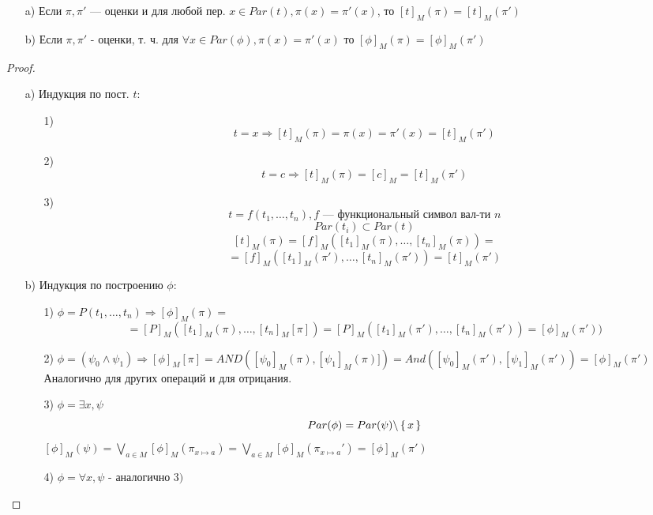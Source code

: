 \begin{theorem}
\begin{itemize}
  \item [a) ] Если $\pi, \pi'$ --- оценки и для любой пер. $x \in Par(t), \pi(x) = \pi'(x)$, то $[t]_M(\pi) = [t]_M(\pi')$
  \item [b) ] Если $\pi, \pi'$ - оценки, т. ч. для $\forall x \in Par(\phi), \pi(x) = \pi'(x)$ то $[\phi]_M(\pi) = [\phi]_M(\pi')$
\end{itemize}
\end{theorem}
\begin{proof}
\begin{itemize}
  \item [a) ] Индукция по пост. $t$:
    \begin{itemize}
      \item [1) ] \[
      t = x \Rightarrow [t]_M(\pi) = \pi(x) = \pi'(x) = [t]_M(\pi')
      \]
    \item [2) ] \[
        t = c \Rightarrow [t]_M(\pi) = [c]_M = [t]_M(\pi')
    \]
  \item [3) ] \[
    t = f(t_1, \ldots, t_n), f \text{ --- функциональный символ вал-ти $n$}
  \]
  \[
  Par(t_i) \subset Par(t)
  \]
  \[
  [t]_M(\pi) = [f]_M([t_1]_M(\pi), \ldots, [t_n]_M(\pi)) = 
  \]
  \[
  = [f]_M([t_1]_M(\pi'), \ldots, [t_n]_M(\pi')) = [t]_M(\pi')
  \]
    \end{itemize}
  \item [b) ] Индукция по построению $\phi$:
    \begin{itemize}
      \item [1) ] $\phi = P(t_1, \ldots, t_n) \Rightarrow [\phi]_M(\pi) =$ \[
      =[P]_M([t_1]_M(\pi), \ldots, [t_n]_M[\pi]) = [P]_M([t_1]_M(\pi'), \ldots, [t_n]_M(\pi')) = [\phi]_M(\pi'))
      \]
    \item [2) ] $\phi = (\psi_0 \land \psi_1) \Rightarrow [\phi]_M[\pi] = AND([\psi_0]_M(\pi), [\psi_1]_M(\pi)]) = And([\psi_0]_M(\pi'), [\psi_1]_M(\pi')) = [\phi]_M(\pi')$ Аналогично для других операций и для отрицания.
  \item [3) ] $\phi = \exists x, \psi$ \[
  Par(\phi) = Par(\psi) \backslash \set{x}
  \] $[\phi]_M(\psi) = \bigvee_{a \in M} [\phi]_M(\pi_{x\mapsto a}) = \bigvee_{a \in M} [\phi]_M(\pi_{x \mapsto a}') = [\phi]_M(\pi')$ \item [4) ] $\phi = \forall x, \psi \text{ -  аналогично $3)$}$ \end{itemize}
\end{itemize}
\end{proof}
